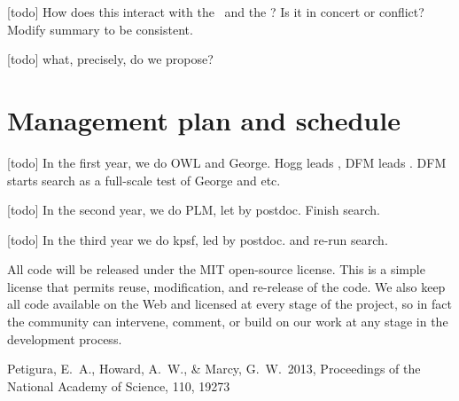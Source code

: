\documentclass[letterpaper,12pt,preprint]{hack_aastex}
\begin{document}
[todo] How does this interact with the \PLM\ and the \OWL?  Is it in concert or conflict?  Modify summary to be consistent.

[todo] what, precisely, do we propose?

\section{Management plan and schedule}

[todo] In the first year, we do OWL and George.  Hogg leads \OWL, DFM leads \George.  DFM starts search as a full-scale test of George and etc.

[todo] In the second year, we do PLM, let by postdoc.  Finish search.

[todo] In the third year we do kpsf, led by postdoc.  and re-run search.

All code will be released under the MIT open-source license.
This is a simple license that permits reuse, modification, and re-release of
the code.
We also keep all code available on the Web and licensed at every stage of
the project, so in fact the community can intervene, comment, or build on our
work at any stage in the development process.

\clearpage
\begin{thebibliography}{}\raggedright%

Petigura, E.~A., Howard, A.~W., \& Marcy, G.~W.\ 2013,
Proceedings of the National Academy of Science, 110, 19273

\end{thebibliography}
\end{document}
